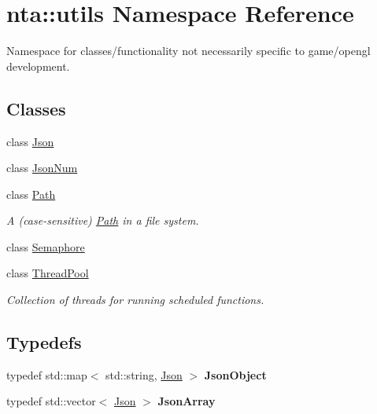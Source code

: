 \hypertarget{namespacenta_1_1utils}{}\section{nta\+:\+:utils Namespace Reference}
\label{namespacenta_1_1utils}


Namespace for classes/functionality not necessarily specific to game/opengl development.  


\subsection*{Classes}
\begin{DoxyCompactItemize}
\item 
class \hyperlink{classnta_1_1utils_1_1Json}{Json}
\item 
class \hyperlink{classnta_1_1utils_1_1JsonNum}{Json\+Num}
\item 
class \hyperlink{classnta_1_1utils_1_1Path}{Path}
\begin{DoxyCompactList}\small\item\em A (case-\/sensitive) \hyperlink{classnta_1_1utils_1_1Path}{Path} in a file system. \end{DoxyCompactList}\item 
class \hyperlink{classnta_1_1utils_1_1Semaphore}{Semaphore}
\item 
class \hyperlink{classnta_1_1utils_1_1ThreadPool}{Thread\+Pool}
\begin{DoxyCompactList}\small\item\em Collection of threads for running scheduled functions. \end{DoxyCompactList}\end{DoxyCompactItemize}
\subsection*{Typedefs}
\begin{DoxyCompactItemize}
\item 
\mbox{\label{namespacenta_1_1utils_aacec41f909698427351bd2d4e6bfb0ff}} 
typedef std\+::map$<$ std\+::string, \hyperlink{classnta_1_1utils_1_1Json}{Json} $>$ {\bfseries Json\+Object}
\item 
\mbox{\label{namespacenta_1_1utils_a016ff68f749b52514dae354976f110ea}} 
typedef std\+::vector$<$ \hyperlink{classnta_1_1utils_1_1Json}{Json} $>$ {\bfseries Json\+Array}
\end{DoxyCompactItemize}
